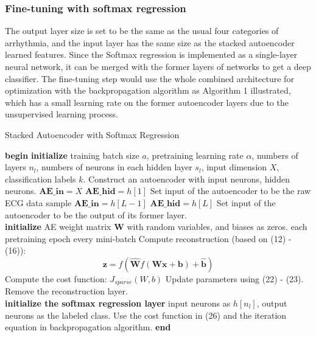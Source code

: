 \documentclass[journal]{IEEEtran}
\begin{document}
\subsubsection{Fine-tuning with softmax regression}
The output layer size is set to be the same as the usual four categories of arrhythmia, and the input layer has the same size as the stacked autoencoder learned features. Since the Softmax regression is implemented as a single-layer neural network, it can be merged with the former layers of networks to get a deep classifier. The fine-tuning step would use the whole combined architecture for optimization with the backpropagation algorithm as Algorithm 1 illustrated, which has a small learning rate on the former autoencoder layers due to the unsupervised learning process.


\begin{algorithm}
\caption{Stacked Autoencoder with  Softmax Regression}
\begin{algorithmic}[1]
\State \textbf{begin}
	\State \textbf{initialize} training batch size $a$, pretraining learning rate $\alpha$, numbers of layers $n_l$, numbers of neurons in each hidden layer $s_l$, input dimension $X$, classification labels $k$.
		\State Construct an autoencoder with  input neurons, hidden neurons.
			\State $\textbf{AE\_in} = X$
			\State $\textbf{AE\_hid} = h[1]$
			\State Set input of the autoencoder to be the raw ECG data sample
		\Else
			\State $\textbf{AE\_in} = h[L-1]$
			\State $\textbf{AE\_hid} =h[L]$
			\State Set input of the autoencoder to be the output of its former layer.
		\EndIf
	\EndFor
\\
	\State \textbf{initialize} AE weight matrix $\mathbf{W}$ with random variables, and biases as zeros.
	\For each pretraining epoch
		\For every mini-batch
			\State Compute reconstruction (based on (12) - (16)):
			\begin{equation}
				\mathbf{z} = f(\hat{\mathbf W}f(\mathbf W\mathbf x+\mathbf b)+\mathbf {\hat{b}})
			\end{equation}
			\State Compute the cost function: $J_{sparse}(W, b)$
			\State Update parameters using (22) - (23).
		\EndFor
	\EndFor
	\State Remove the reconstruction layer.
\\
	\State \textbf{initialize the softmax regression layer} input neurons as $h[n_l]$, output neurons as the labeled class.
			\State Use the cost function in (26) and the iteration equation in backpropagation algorithm.
		\EndFor
	\EndFor
\State \textbf{end}
\end{algorithmic}
\end{algorithm}
\end{document}
